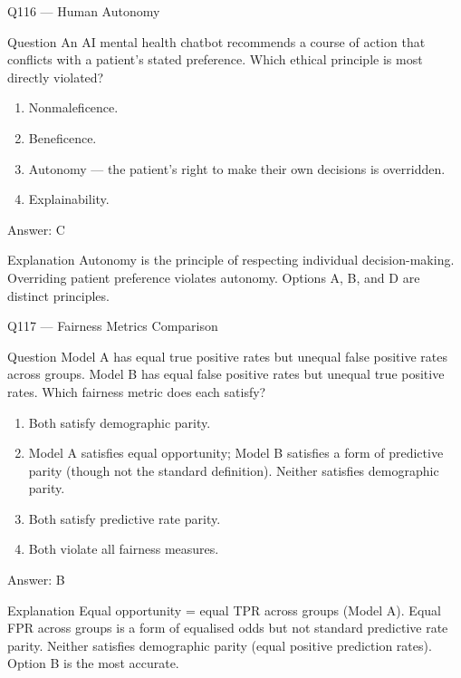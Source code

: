 \documentclass[aspectratio=169,8pt]{beamer}
\begin{document}
\begin{frame}{Q116 --- Human Autonomy}
\begin{block}{Question}
An AI mental health chatbot recommends a course of action that conflicts with a patient's stated preference. Which ethical principle is most directly violated?
\end{block}
\begin{enumerate}
\item Nonmaleficence.
\item Beneficence.
\item Autonomy --- the patient's right to make their own decisions is overridden.
\item Explainability.
\end{enumerate}
\begin{exampleblock}{Answer: C}\end{exampleblock}
\begin{block}{Explanation}
Autonomy is the principle of respecting individual decision-making. Overriding patient preference violates autonomy. Options A, B, and D are distinct principles.
\end{block}
\end{frame}

\begin{frame}{Q117 --- Fairness Metrics Comparison}
\begin{block}{Question}
Model A has equal true positive rates but unequal false positive rates across groups. Model B has equal false positive rates but unequal true positive rates. Which fairness metric does each satisfy?
\end{block}
\begin{enumerate}
\item Both satisfy demographic parity.
\item Model A satisfies equal opportunity; Model B satisfies a form of predictive parity (though not the standard definition). Neither satisfies demographic parity.
\item Both satisfy predictive rate parity.
\item Both violate all fairness measures.
\end{enumerate}
\begin{exampleblock}{Answer: B}\end{exampleblock}
\begin{block}{Explanation}
Equal opportunity = equal TPR across groups (Model A). Equal FPR across groups is a form of equalised odds but not standard predictive rate parity. Neither satisfies demographic parity (equal positive prediction rates). Option B is the most accurate.
\end{block}
\end{frame}
\end{document}
